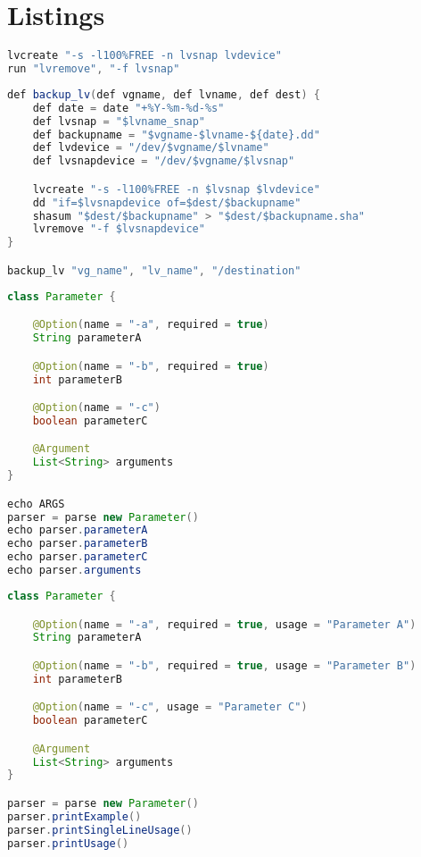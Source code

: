 \chapter{Listings}

\begin{lstlisting}[style=nonumbers, language=Java, label={lst:script_example_parameter}, caption={Example of implicit and explicit execution of a command}]
lvcreate "-s -l100%FREE -n lvsnap lvdevice"
run "lvremove", "-f lvsnap"
\end{lstlisting}

\begin{lstlisting}[style=nonumbers, language=Java, label={lst:script_example_parameter}, caption={Example of script function with parameter}]
def backup_lv(def vgname, def lvname, def dest) {
    def date = date "+%Y-%m-%d-%s"
    def lvsnap = "$lvname_snap"
    def backupname = "$vgname-$lvname-${date}.dd"
    def lvdevice = "/dev/$vgname/$lvname"
    def lvsnapdevice = "/dev/$vgname/$lvsnap"

    lvcreate "-s -l100%FREE -n $lvsnap $lvdevice"
    dd "if=$lvsnapdevice of=$dest/$backupname"
    shasum "$dest/$backupname" > "$dest/$backupname.sha"
    lvremove "-f $lvsnapdevice"
}

backup_lv "vg_name", "lv_name", "/destination"
\end{lstlisting}

\begin{lstlisting}[style=nonumbers, language=Java, label={lst:script_parse_cl_parameter}, caption={Parse command line parameter}]
class Parameter {

    @Option(name = "-a", required = true)
    String parameterA

    @Option(name = "-b", required = true)
    int parameterB

    @Option(name = "-c")
    boolean parameterC

    @Argument
    List<String> arguments
}

echo ARGS
parser = parse new Parameter()
echo parser.parameterA
echo parser.parameterB
echo parser.parameterC
echo parser.arguments
\end{lstlisting}

\begin{lstlisting}[style=nonumbers, language=Java, label={lst:script_print_usage_cl_parameter}, caption={Print usage of command line parameter}]
class Parameter {

    @Option(name = "-a", required = true, usage = "Parameter A")
    String parameterA

    @Option(name = "-b", required = true, usage = "Parameter B")
    int parameterB

    @Option(name = "-c", usage = "Parameter C")
    boolean parameterC

    @Argument
    List<String> arguments
}

parser = parse new Parameter()
parser.printExample()
parser.printSingleLineUsage()
parser.printUsage()
\end{lstlisting}

